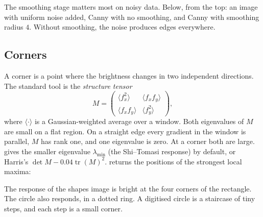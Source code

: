 The smoothing stage matters most on noisy data. Below, from the top: an image
with uniform noise added, Canny with no smoothing, and Canny with smoothing
radius \(4\). Without smoothing, the noise produces edges everywhere.


\subsection{Corners}

A corner is a point where the brightness changes in two independent directions.
The standard tool is the \emph{structure tensor}
\[
  M = \begin{pmatrix}
    \langle f_x^2 \rangle & \langle f_x f_y \rangle \\
    \langle f_x f_y \rangle & \langle f_y^2 \rangle
  \end{pmatrix},
\]
where \(\langle\cdot\rangle\) is a Gaussian-weighted average over a window. Both
eigenvalues of \(M\) are small on a flat region. On a straight edge every
gradient in the window is parallel, \(M\) has rank one, and one eigenvalue is
zero. At a corner both are large.  gives the smaller eigenvalue
\(\lambda_{\min}\) (the Shi--Tomasi response) by default, or Harris's
\(\det M - 0.04 \operatorname{tr}(M)^2\).  returns the positions of
the strongest local maxima:

\begin{codepairs}
\end{codepairs}

The response of the shapes image is bright at the four corners of the rectangle.
The circle also responds, in a dotted ring. A digitised circle is a staircase of
tiny steps, and each step is a small corner.


